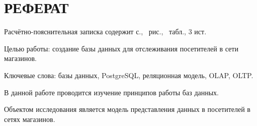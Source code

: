 \section*{РЕФЕРАТ}

Расчётно-пояснительная записка содержит \pageref{LastPage} с., \totalfigures\ рис., \totaltables\ табл., 3 ист.

Целью работы: создание базы данных для отслеживания посетителей в сети магазинов.

Ключевые слова: базы данных, PostgreSQL, реляционная модель, OLAP, OLTP.

В данной работе проводится изучение принципов работы баз данных.

Объектом исследования является модель представления данных в посетителей в сетях магазинов.

\pagebreak